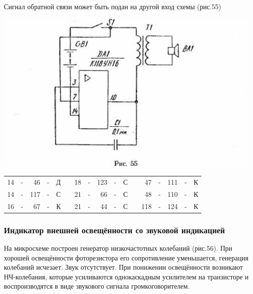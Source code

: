 \documentclass[12pt]{article}
\begin{document}
\hrulefill

Сигнал обратной связи может быть подан на другой вход схемы (рис.55)

\vspace*{0.3cm}
\includegraphics[scale=1, angle=0]{ekon3_054_2}

\newpage

\hrulefill

\begin{tabular}{r c r c r p{2cm} r c r c r p{2cm} r c r c r}
 14 & - &  46 & - & Д &     &  18 & - & 123 & - & С &    &  47 & - & 111 & - & К\\
 14 & - & 117 & - & С &     &  21 & - &  66 & - & С &    &  48 & - & 110 & - & К\\
 16 & - &  67 & - & К &     &  21 & - &  44 & - & С &    & 118 & - & 124 & - & К\\
\end{tabular}

\hrulefill

\subsubsection{Индикатор внешней освещённости со звуковой индикацией}

На микросхеме построен генератор низкочастотных колебаний (рис.56). При хорошей освещённости фоторезистора его сопротивление уменьшается, генерация колебаний исчезает. Звук отсутствует. При понижении освещённости возникают НЧ-колебания, которые усиливаются однокаскадным усилителем на транзисторе и воспроизводятся в виде звукового сигнала громкоговорителем.
\end{document}
